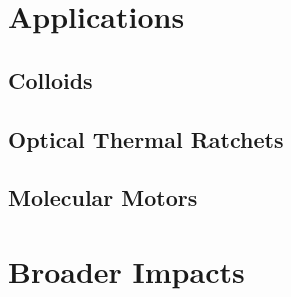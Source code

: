 \documentclass[ aip, 12pt]{revtex4-1} %
\begin{document}
\section{Applications}
\subsection{Colloids}


\subsection {Optical Thermal Ratchets}


\subsection{Molecular Motors}

\section{Broader Impacts}




\end{document}

